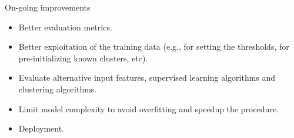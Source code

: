 \documentclass{beamer}
\begin{document}

\begin{frame}{On-going improvements}

\begin{itemize}
\item Better evaluation metrics.\\[2em]

\item Better exploitation of the training data (e.g., for setting the thresholds, for pre-initializing known clusters, etc).\\[2em]

\item Evaluate alternative input features, supervised learning algorithms and clustering algorithms.\\[2em]

\item Limit model complexity to avoid overfitting and speedup the procedure.\\[2em]

\item Deployment.
\end{itemize}

\end{frame}
\end{document}
